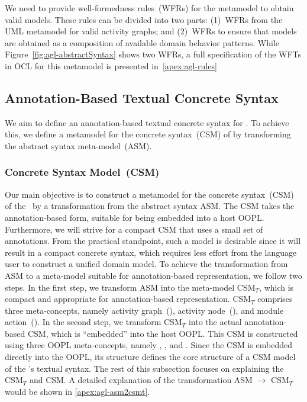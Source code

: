 We need to provide well-formedness rules~(WFRs) for the metamodel to obtain valid \agl models. These rules can be divided into two parts: (1)~WFRs from the UML metamodel for valid activity graphs; and (2)~WFRs to ensure that \agl models are obtained as a composition of available domain behavior patterns. While Figure~\ref{fig:agl-abstractSyntax} shows two WFRs, a full specification of the WFTs in OCL for this metamodel is presented in~\ref{apex:agl-rules}

\subsection{Annotation-Based Textual Concrete Syntax}
\label{sect:agl-annotation-csm}
%
We aim to define an annotation-based textual concrete syntax for \agl. To achieve this, we define a metamodel for the concrete syntax~(CSM) of \agl by transforming the abstract syntax meta-model~(ASM).
\subsubsection{Concrete Syntax Model~(CSM)} \label{sect:agl-asm}

Our main objective is to construct a metamodel for the concrete syntax~(CSM) of the \agl~by a transformation from the abstract syntax ASM. The CSM takes the annotation-based form, suitable for being embedded into a host OOPL. Furthermore, we will strive for a compact CSM that uses a small set of annotations. From the practical standpoint, such a model is desirable since it will result in a compact concrete syntax, which requires less effort from the language user to construct a unified domain model. To achieve the transformation from ASM to a meta-model suitable for annotation-based representation, we follow two steps. In the first step, we transform ASM into the meta-model CSM$_T$, which is compact and appropriate for annotation-based representation. CSM$_T$ comprises three meta-concepts, namely activity graph~(), activity node~(), and module action~(). In the second step, we transform CSM$_T$ into the actual annotation-based CSM, which is ``embedded'' into the host OOPL. This CSM is constructed using three OOPL meta-concepts, namely , , and . Since the CSM is embedded directly into the OOPL, its structure defines the core structure of a CSM model of the \agl's textual syntax.
%
The rest of this subsection focuses on explaining the CSM$_T$ and CSM. A detailed explanation of the transformation ASM $\rightarrow$ CSM$_T$ would be shown in \ref{apex:agl-asm2csmt}. 
